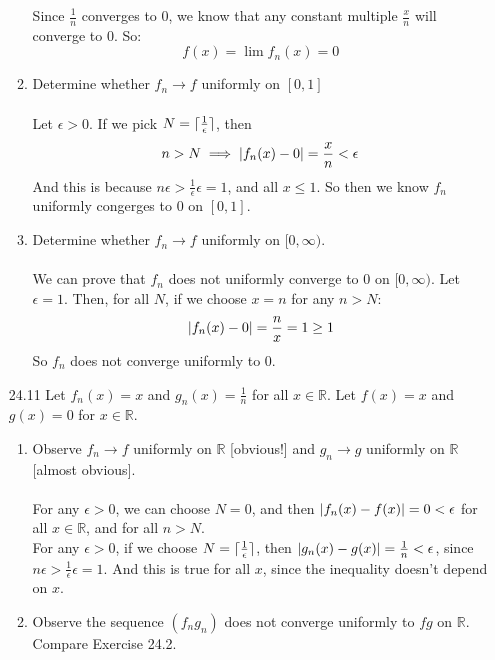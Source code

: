 \begin{enumerate}
\begin{enumerate}
        Since $\frac{1}{n}$ converges to $0$, we know that any constant multiple $\frac{x}{n}$ will converge to $0$. So:
        $$f(x) = \lim_{} f_n(x) = 0$$
      \item Determine whether $f_n \rightarrow f$ uniformly on $[0,1]$\\\\

        Let $\epsilon > 0$. If we pick $N = \lceil\frac{1}{\epsilon}\rceil$, then
        $$n > N \implies \left\vert f_n(x) - 0 \right\vert = \frac{x}{n} < \epsilon$$
        And this is because $n \epsilon > \frac{1}{\epsilon} \epsilon = 1$, and all $x \leq 1$. So then we know $f_n$ uniformly congerges to $0$ on $[0,1]$.
      \item Determine whether $f_n \rightarrow f$ uniformly on $[0, \infty)$.\\\\

        We can prove that $f_n$ does not uniformly converge to $0$ on $[0, \infty)$. Let $\epsilon = 1$. Then, for all $N$, if we choose $x=n$ for any $n > N$:
        $$\left\vert f_n(x) - 0 \right\vert = \frac{n}{x} = 1 \geq 1$$
        So $f_n$ does not converge uniformly to $0$.
    \end{enumerate}
  \item [24.11]
    Let $f_n(x) = x$ and $g_n(x) = \frac{1}{n}$ for all $x \in \mathds{R}$. Let $f(x) = x$ and $g(x) = 0$ for $x \in \mathds{R}$.
    \begin{enumerate}
      \item Observe $f_n \rightarrow f$ uniformly on $\mathds{R}$ [obvious!] and $g_n \rightarrow g$ uniformly on $\mathds{R}$ [almost obvious].\\\\

        For any $\epsilon > 0$, we can choose $N = 0$, and then $\left\vert f_n(x) - f(x) \right\vert = 0 < \epsilon$ for all $x \in \mathds{R}$, and for all $n > N$.\\

        For any $\epsilon > 0$, if we choose $N = \lceil\frac{1}{\epsilon}\rceil$, then $\left\vert g_n(x) - g(x) \right\vert = \frac{1}{n} < \epsilon$, since $n \epsilon > \frac{1}{\epsilon} \epsilon = 1$. And this is true for all $x$, since the inequality doesn't depend on $x$.\\

      \item Observe the sequence $(f_ng_n)$ does not converge uniformly to $fg$ on $\mathds{R}$. Compare Exercise 24.2.\\\\


\end{enumerate}
\end{enumerate}
